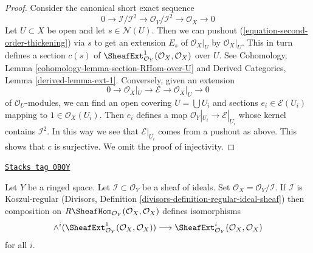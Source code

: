 \begin{proof}
Consider the canonical short exact sequence
\begin{equation}
\label{equation-second-order-thickening}
0 \to \mathcal{I}/\mathcal{I}^2 \to \mathcal{O}_Y/\mathcal{I}^2 \to
\mathcal{O}_X \to 0
\end{equation}
Let $U \subset X$ be open and let $s \in \mathcal{N}(U)$. Then we can
pushout (\ref{equation-second-order-thickening}) via $s$ to
get an extension $E_s$ of $\mathcal{O}_X|_U$ by $\mathcal{O}_X|_U$.
This in turn defines a section $c(s)$ of
$\SheafExt^1_{\mathcal{O}_Y}(\mathcal{O}_X, \mathcal{O}_X)$
over $U$.
See Cohomology, Lemma \ref{cohomology-lemma-section-RHom-over-U}
and Derived Categories, Lemma \ref{derived-lemma-ext-1}.
Conversely, given an extension
$$
0 \to \mathcal{O}_X|_U \to \mathcal{E} \to \mathcal{O}_X|_U \to 0
$$
of $\mathcal{O}_U$-modules, we can find an open covering
$U = \bigcup U_i$ and sections $e_i \in \mathcal{E}(U_i)$
mapping to $1 \in \mathcal{O}_X(U_i)$. Then $e_i$ defines a map
$\mathcal{O}_Y|_{U_i} \to \mathcal{E}|_{U_i}$ whose kernel
contains $\mathcal{I}^2$. In this way we see that
$\mathcal{E}|_{U_i}$ comes from a pushout as above.
This shows that $c$ is surjective. We omit the proof
of injectivity.
\end{proof}

\begin{lemma}
\label{duality-lemma-regular-ideal-ext}
\href{https://stacks.math.columbia.edu/tag/0BQY}{\texttt{Stacks tag 0BQY}}

Let $Y$ be a ringed space. Let $\mathcal{I} \subset \mathcal{O}_Y$
be a sheaf of ideals. Set $\mathcal{O}_X = \mathcal{O}_Y/\mathcal{I}$.
If $\mathcal{I}$ is Koszul-regular
(Divisors, Definition \ref{divisors-definition-regular-ideal-sheaf})
then composition on $R\SheafHom_{\mathcal{O}_Y}(\mathcal{O}_X, \mathcal{O}_X)$
defines isomorphisms
$$
\wedge^i(\SheafExt^1_{\mathcal{O}_Y}(\mathcal{O}_X, \mathcal{O}_X))
\longrightarrow
\SheafExt^i_{\mathcal{O}_Y}(\mathcal{O}_X, \mathcal{O}_X)
$$
for all $i$.
\end{lemma}

